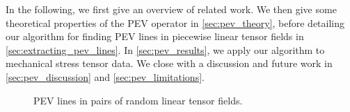 %
In the following, we first give an overview of related work.
%
We then give some theoretical properties of the \ac{PEV} operator in
\cref{sec:pev_theory}, before detailing our algorithm for finding \ac{PEV} lines
in piecewise linear tensor fields in \cref{sec:extracting_pev_lines}.
%
In \cref{sec:pev_results}, we apply our algorithm to mechanical stress tensor
data.
%
We close with a discussion and future work in \cref{sec:pev_discussion} and
\cref{sec:pev_limitations}.
%
\begin{figure}[t]
    \centering
    
    \caption{\ac{PEV} lines in pairs of random linear tensor fields.}
    \label{fig:rand_lines}
\end{figure}
%
%
